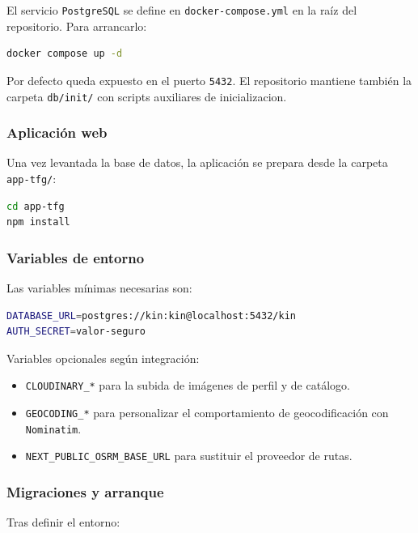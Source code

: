 El servicio \texttt{PostgreSQL} se define en \texttt{docker-compose.yml} en la raíz del repositorio. Para arrancarlo:

\begin{lstlisting}[language=bash]
docker compose up -d
\end{lstlisting}

Por defecto queda expuesto en el puerto \texttt{5432}. El repositorio mantiene también la carpeta \texttt{db/init/} con scripts auxiliares de inicializacion.

\subsubsection*{Aplicación web}

Una vez levantada la base de datos, la aplicación se prepara desde la carpeta \texttt{app-tfg/}:

\begin{lstlisting}[language=bash]
cd app-tfg
npm install
\end{lstlisting}

\subsubsection*{Variables de entorno}

Las variables mínimas necesarias son:

\begin{lstlisting}[language=bash]
DATABASE_URL=postgres://kin:kin@localhost:5432/kin
AUTH_SECRET=valor-seguro
\end{lstlisting}

Variables opcionales según integración:

\begin{itemize}
    \item \texttt{CLOUDINARY\_*} para la subida de imágenes de perfil y de catálogo.
    \item \texttt{GEOCODING\_*} para personalizar el comportamiento de geocodificación con \texttt{Nominatim}.
    \item \texttt{NEXT\_PUBLIC\_OSRM\_BASE\_URL} para sustituir el proveedor de rutas.
\end{itemize}

\subsubsection*{Migraciones y arranque}

Tras definir el entorno:


